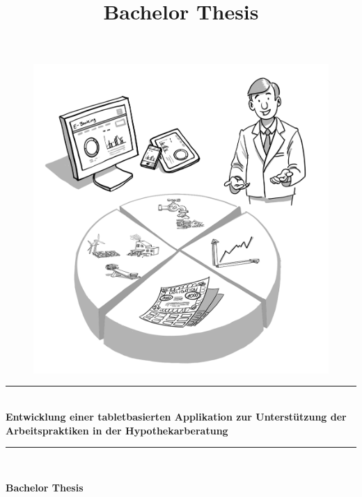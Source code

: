 \documentclass[a4paper,twoside, openright]{report}
\title{Bachelor Thesis}
\newcommand{\HRule}{\rule{\linewidth}{0.3mm}} %
\begin{document}
\begin{titlepage}
\begingroup
\centering
\vspace*{\baselineskip}

\thispagestyle{empty}

\begin{figure}[H]
	\centering
	\begin{minipage}{.49\textwidth}
		\centering
		\includegraphics[scale=0.3]{img/InvestmentSolutions.jpg}
	\end{minipage}
\end{figure}

\vspace*{1\baselineskip}

\HRule \\[0.4cm]
{\LARGE \textbf{Entwicklung einer tabletbasierten Applikation zur Unterstützung der Arbeitspraktiken in der Hypothekarberatung}}
\HRule \\[1.5cm]

\vspace*{1\baselineskip}

{\large \textbf{Bachelor Thesis}}

\vspace*{1\baselineskip}


\end{titlepage}
\end{document}
